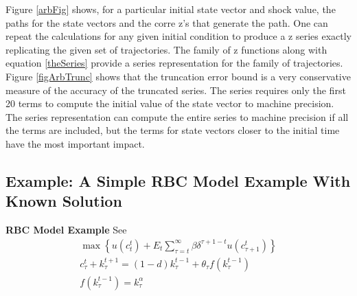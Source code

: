\documentclass[12pt]{article}
\begin{document}
Figure \ref{arbFig} shows, for a particular initial state vector and shock value,  the paths for the state vectors and the corre z's that generate the path.
One can repeat the calculations for any given initial condition to produce
a z series exactly replicating the given set of trajectories.  The family
of z functions along with equation \ref{theSeries} provide a series 
representation for the family of trajectories.  Figure \ref{figArbTrunc} shows
that the truncation error bound is a very conservative measure of the accuracy
of the truncated series.  The series requires only the first 20 terms to compute
the initial value of the state vector to machine precision. 
The series representation can compute the entire series to machine precision
if all the terms are included, but the terms for state vectors closer 
to the initial time have the most important impact.






\subsection{Example: A Simple RBC Model Example With Known Solution}
\label{sec:simple-rbc-model-2}


 {\bf RBC Model Example}
  See \cite{Maliar2005}
 \begin{gather*}
   \max\left \{  u(c_t^t) + E_t \sum_{\tau=t}^\infty \beta \delta^{\tau+1-t}u(c_{\tau+1}^t)\right \}\\
c_\tau^t + k_\tau^{t+1}=(1-d)k_\tau^{t-1} + \theta_\tau f(k_\tau^{t-1})\\
f(k_\tau^{t-1})= k_\tau^\alpha
 \end{gather*}
\end{document}

